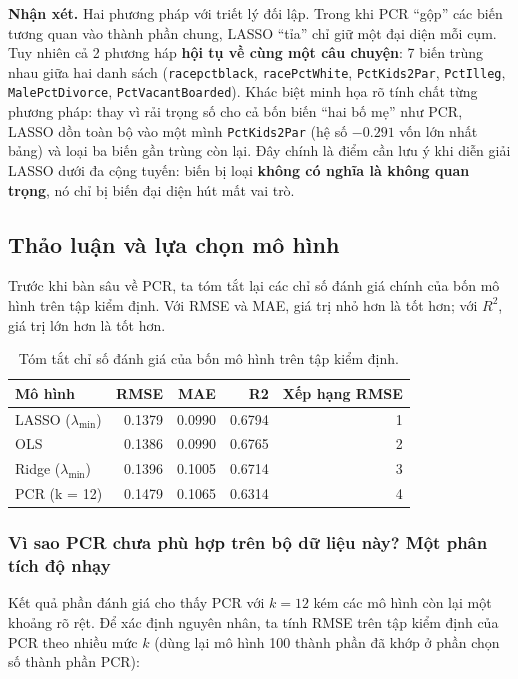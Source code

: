 \textbf{Nhận xét.} Hai phương pháp với triết lý đối lập. Trong khi PCR
``gộp'' các biến tương quan vào thành phần chung, LASSO ``tỉa'' chỉ giữ
một đại diện mỗi cụm. Tuy nhiên cả 2 phương háp \textbf{hội tụ về cùng
một câu chuyện}: 7 biến trùng nhau giữa hai danh sách
(\texttt{racepctblack}, \texttt{racePctWhite}, \texttt{PctKids2Par},
\texttt{PctIlleg}, \texttt{MalePctDivorce}, \texttt{PctVacantBoarded}).
Khác biệt minh họa rõ tính chất từng phương pháp: thay vì rải trọng số
cho cả bốn biến ``hai bố mẹ'' như PCR, LASSO dồn toàn bộ vào một mình
\texttt{PctKids2Par} (hệ số \(-0.291\) vốn lớn nhất bảng) và loại ba
biến gần trùng còn lại. Đây chính là điểm cần lưu ý khi diễn giải LASSO
dưới đa cộng tuyến: biến bị loại \textbf{không có nghĩa là không quan
trọng}, nó chỉ bị biến đại diện hút mất vai trò.

\subsection{Thảo luận và lựa chọn mô
hình}\label{thux1ea3o-luux1eadn-vuxe0-lux1ef1a-chux1ecdn-muxf4-huxecnh}

Trước khi bàn sâu về PCR, ta tóm tắt lại các chỉ số đánh giá chính của
bốn mô hình trên tập kiểm định. Với RMSE và MAE, giá trị nhỏ hơn là tốt
hơn; với \(R^2\), giá trị lớn hơn là tốt hơn.

\begin{longtable}[t]{lrrrr}
\caption{\label{tab:final-metrics-table}Tóm tắt chỉ số đánh giá của bốn mô hình trên tập kiểm định.}\\
\toprule
Mô hình & RMSE & MAE & R2 & Xếp hạng RMSE\\
\midrule
LASSO ($\lambda_{\min}$) & 0.1379 & 0.0990 & 0.6794 & 1\\
OLS & 0.1386 & 0.0990 & 0.6765 & 2\\
Ridge ($\lambda_{\min}$) & 0.1396 & 0.1005 & 0.6714 & 3\\
PCR (k = 12) & 0.1479 & 0.1065 & 0.6314 & 4\\
\bottomrule
\end{longtable}

\subsubsection{Vì sao PCR chưa phù hợp trên bộ dữ liệu này? Một phân
tích độ
nhạy}\label{vuxec-sao-pcr-chux1b0a-phuxf9-hux1ee3p-truxean-bux1ed9-dux1eef-liux1ec7u-nuxe0y-mux1ed9t-phuxe2n-tuxedch-ux111ux1ed9-nhux1ea1y}

Kết quả phần đánh giá cho thấy PCR với \(k = 12\) kém các mô hình còn
lại một khoảng rõ rệt. Để xác định nguyên nhân, ta tính RMSE trên tập
kiểm định của PCR theo nhiều mức \(k\) (dùng lại mô hình 100 thành phần
đã khớp ở phần chọn số thành phần PCR):

